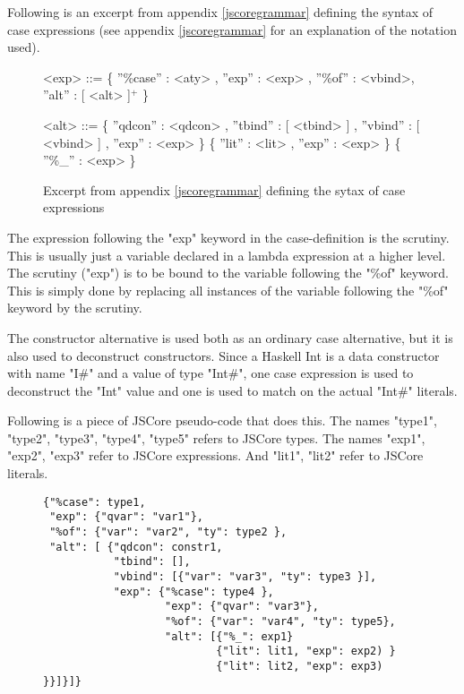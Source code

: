 Following is an excerpt from appendix \ref{jscoregrammar} defining the syntax 
of case expressions (see appendix \ref{jscoregrammar} for an explanation of the
notation used).

\begin{figure}[H]
\scriptsize
\begin{grammar}

<exp>		  ::= 	 \{ ''\%case'' : <aty> , ''exp'' : <exp> , ''\%of'' : <vbind>, ''alt'' : [ <alt> ]$^{+}$ \}	

<alt>		  ::= 	 \{ ''qdcon'' : <qdcon> , ''tbind'' : [ <tbind> ] , ''vbind'' : [ <vbind> ] , ''exp'' : <exp> \}
		  \alt 			 \{ ''lit'' : <lit> , ''exp'' : <exp> \}
		  \alt 			 \{ ''\%\_'' : <exp> \}	
\end{grammar}

\label{caseexpr}
\caption{Excerpt from appendix \ref{jscoregrammar} defining the sytax of case expressions}
\end{figure}

The expression following the "exp" keyword in the case-definition is the scrutiny. This
is usually just a variable declared in a lambda expression at a higher level.
The scrutiny ("exp") is to be bound to the variable following the "\%of" keyword.
This is simply done by replacing all instances of the variable following the "\%of" keyword
by the scrutiny.

The constructor alternative is used both as an ordinary case alternative, but it is
also used to deconstruct constructors. Since a Haskell Int is a data
constructor with name "I\#" and a value of type "Int\#", one case expression is used 
to deconstruct the "Int" value and one is used to match on the actual "Int\#" literals.

Following is a piece of JSCore pseudo-code that does this. 
The names "type1", "type2", "type3", "type4", "type5" refers to JSCore types. 
The names "exp1", "exp2", "exp3" refer to JSCore expressions. And "lit1", "lit2" refer
to JSCore literals.

\begin{figure}[H]
\lstset{ %
language=Haskell,
caption=JSCore case expression,
}
\begin{lstlisting}
{"%case": type1,
 "exp": {"qvar": "var1"},
 "%of": {"var": "var2", "ty": type2 },
 "alt": [ {"qdcon": constr1,
           "tbind": [],
           "vbind": [{"var": "var3", "ty": type3 }],
           "exp": {"%case": type4 },
                   "exp": {"qvar": "var3"},
                   "%of": {"var": "var4", "ty": type5},
                   "alt": [{"%_": exp1}
                           {"lit": lit1, "exp": exp2) }
                           {"lit": lit2, "exp": exp3) }}]}]}



\end{lstlisting}
\end{figure}


